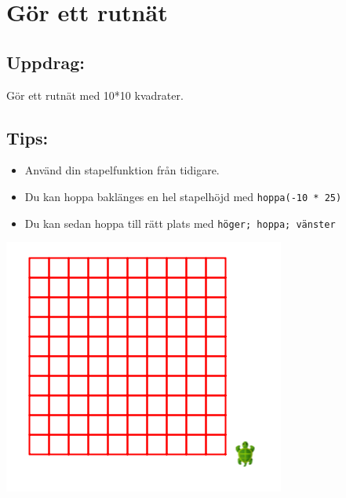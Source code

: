 \chapter{Gör ett rutnät}
\begin{multicols}{2}
\section*{\color{BrickRed}Uppdrag:}
Gör ett rutnät med 10*10 kvadrater.
\section*{\color{OliveGreen}Tips:}


\begin{itemize}

\item {Använd din stapelfunktion från tidigare.}
\item {Du kan hoppa baklänges en hel stapelhöjd med \lstinline{hoppa(-10 * 25)}}
\item {Du kan sedan hoppa till rätt plats med \lstinline{höger; hoppa; vänster}}

\end{itemize}



\columnbreak

\begin{center}
\includegraphics{../img/square-grid.png}
\end{center}

\end{multicols}

